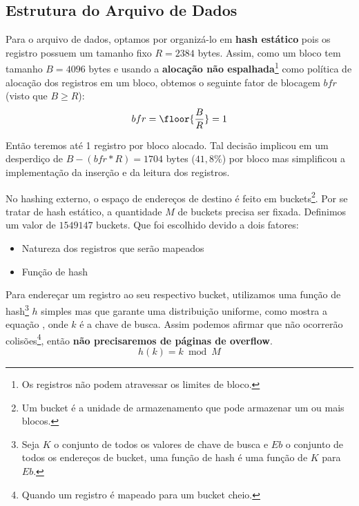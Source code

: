 \subsection{Estrutura do Arquivo de Dados}\label{subsec:estrutura_do_arquivo_de_dados}

Para o arquivo de dados, optamos por organizá-lo em \textbf{hash estático} pois os registro possuem um tamanho fixo $R = 2384$ bytes. Assim, como um bloco tem tamanho $B = 4096$ bytes e usando a \textbf{alocação não espalhada}\footnote{Os registros não podem atravessar os limites de bloco.} como política de alocação dos registros em um bloco, obtemos o seguinte fator de blocagem $bfr$ (visto que $B \geq R$):
\begin{equation}\label{eq:binomial_distribution}
    bfr = \floor{\frac{B}{R}} = 1
\end{equation}

Então teremos até 1 registro por bloco alocado. Tal decisão implicou em um desperdiço de $B - (bfr * R) = 1704$ bytes ($41,8\%$) por bloco mas simplificou a implementação da inserção e da leitura dos registros.

No hashing externo, o espaço de endereços de destino é feito em buckets\footnote{Um bucket é a unidade de armazenamento que pode armazenar um ou mais blocos.}.
Por se tratar de hash estático, a quantidade $M$ de buckets precisa ser fixada. Definimos um valor de $1549147$ buckets. Que foi escolhido devido a dois fatores:
\begin{itemize}[noitemsep]
    \item Natureza dos registros que serão mapeados
    \item Função de hash
\end{itemize}


Para endereçar um registro ao seu respectivo bucket, utilizamos uma função de hash\footnote{Seja $K$ o conjunto de todos os valores de chave de busca e $Eb$ o conjunto de todos os endereços de bucket, uma função de hash é uma função de $K$ para $Eb$.} $h$ simples mas que garante uma distribuição uniforme, como mostra a equação , onde $k$ é a chave de busca.
Assim podemos afirmar que não ocorrerão colisões\footnote{Quando um registro é mapeado para um bucket cheio.}, então \textbf{não precisaremos de páginas de overflow}.
\begin{equation}\label{eq:funcao_hash}
    h(k) = k \bmod M
\end{equation}

